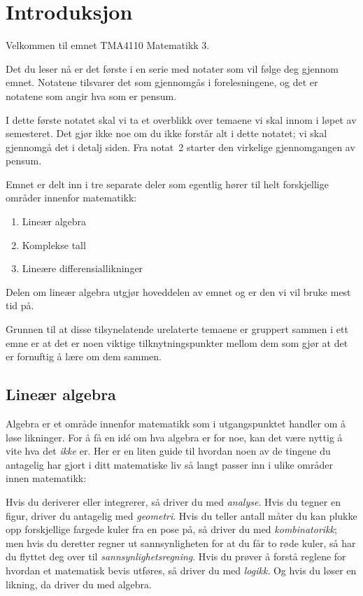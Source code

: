 

\chapter*{Introduksjon}

Velkommen til emnet TMA4110 Matematikk 3.

Det du leser nå er det første i en serie med notater som vil følge deg
gjennom emnet.  Notatene tilsvarer det som gjennomgås i
forelesningene, og det er notatene som angir hva som er pensum.

I dette første notatet skal vi ta et overblikk over temaene vi skal
innom i løpet av semesteret.  Det gjør ikke noe om du ikke forstår alt
i dette notatet; vi skal gjennomgå det i detalj siden.  Fra notat~2
starter den virkelige gjennomgangen av pensum.

\smallskip

Emnet er delt inn i tre separate deler som egentlig hører til helt
forskjellige områder innenfor matematikk:
\begin{enumerate}
\item Lineær algebra
\item Komplekse tall
\item Lineære differensiallikninger
\end{enumerate}
Delen om lineær algebra utgjør hoveddelen av emnet og er den vi vil
bruke mest tid på.

\smallskip

Grunnen til at disse tilsynelatende urelaterte temaene er gruppert
sammen i ett emne er at det er noen viktige tilknytningspunkter mellom
dem som gjør at det er fornuftig å lære om dem sammen.


\section*{Lineær algebra}

Algebra er et område innenfor matematikk som i utgangspunktet handler
om å løse likninger.  For å få en idé om hva algebra er for noe, kan
det være nyttig å vite hva det \emph{ikke} er.  Her er en liten guide
til hvordan noen av de tingene du antagelig har gjort i ditt
matematiske liv så langt passer inn i ulike områder innen matematikk:

Hvis du deriverer eller integrerer, så driver du med \emph{analyse}.
Hvis du tegner en figur, driver du antagelig med \emph{geometri}.
Hvis du teller antall måter du kan plukke opp forskjellige fargede
kuler fra en pose på, så driver du med \emph{kombinatorikk}; men hvis
du deretter regner ut sannsynligheten for at du får to røde kuler, så
har du flyttet deg over til \emph{sannsynlighetsregning}.  Hvis du
prøver å forstå reglene for hvordan et matematisk bevis utføres, så
driver du med \emph{logikk}.  Og hvis du løser en likning, da driver
du med algebra.

